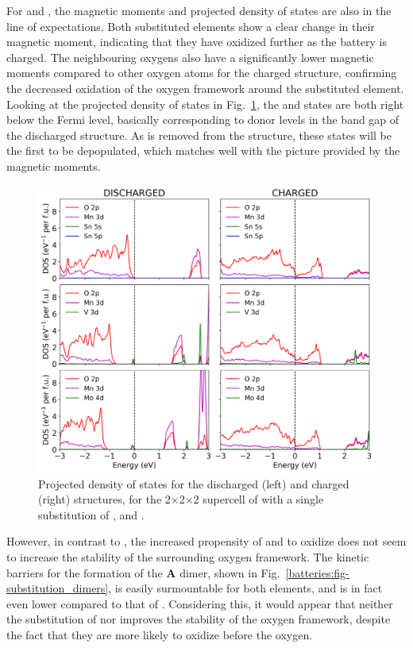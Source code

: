 \begin{refsection}
\pagebreak[5] For  and , the magnetic moments and projected density of states 
are also in the line of expectations. Both substituted elements show a clear 
change in their magnetic moment, indicating that they have oxidized further 
as the battery is charged. The neighbouring oxygens  also have a 
significantly lower magnetic moments compared to other oxygen atoms  
for the charged structure, confirming the decreased oxidation of the oxygen 
framework around the substituted element. Looking at the projected density of 
states in Fig.~\ref{batteries:fig-substitution_pdos_pbeu}, the  and 
 states are both right below the Fermi level, basically corresponding 
to donor levels in the band gap of the discharged  structure. As 
 is removed from the structure, these states will be the first to be 
depopulated, which matches well with the picture provided by the magnetic 
moments. 
 
\begin{figure}[ht] 
\centering 
\captionsetup{width=0.9\linewidth}
\includegraphics[width=\textwidth]{figures/batteries/substitution_pdos_pbeu.png} 
\caption{Projected density of states for the discharged (left) and charged 
(right) structures, for the 2$\times$2$\times$2 supercell of  with a single 
substitution of ,  and .} 
\label{batteries:fig-substitution_pdos_pbeu} 
\end{figure} 

However, in contrast to , the increased propensity of  and 
 to oxidize does not seem to increase the stability of the surrounding 
oxygen framework. The kinetic barriers for the formation of the \textbf{A} 
dimer, shown in Fig.~\ref{batteries:fig-substitution_dimers}, is easily 
surmountable for both elements, and is in fact even lower compared to that of 
. Considering this, it would appear that neither the substitution 
of  nor  improves the stability of the oxygen framework, despite 
the fact that they are more likely to oxidize before the oxygen.  
 

\end{refsection}
